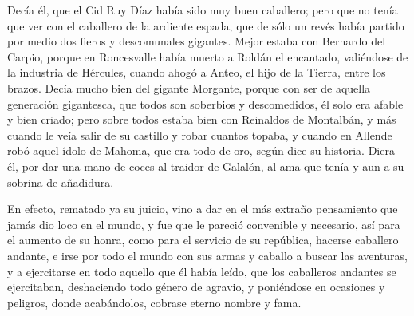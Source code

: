 \documentclass[12pt,
               twocolumn
              ]{article}
\begin{document}
Decía él, que el Cid Ruy Díaz había sido muy buen caballero; pero que
no tenía que ver con el caballero de la ardiente espada, que de sólo
un revés había partido por medio dos fieros y descomunales
gigantes. Mejor estaba con Bernardo del Carpio, porque en Roncesvalle
había muerto a Roldán el encantado, valiéndose de la industria de
Hércules, cuando ahogó a Anteo, el hijo de la Tierra, entre los
brazos. Decía mucho bien del gigante Morgante, porque con ser de
aquella generación gigantesca, que todos son soberbios y descomedidos,
él solo era afable y bien criado; pero sobre todos estaba bien con
Reinaldos de Montalbán, y más cuando le veía salir de su castillo y
robar cuantos topaba, y cuando en Allende robó aquel ídolo de Mahoma,
que era todo de oro, según dice su historia. Diera él, por dar una
mano de coces al traidor de Galalón, al ama que tenía y aun a su
sobrina de añadidura.

En efecto, rematado ya su juicio, vino a dar en el más extraño
pensamiento que jamás dio loco en el mundo, y fue que le pareció
convenible y necesario, así para el aumento de su honra, como para el
servicio de su república, hacerse caballero andante, e irse por todo
el mundo con sus armas y caballo a buscar las aventuras, y a
ejercitarse en todo aquello que él había leído, que los caballeros
andantes se ejercitaban, deshaciendo todo género de agravio, y
poniéndose en ocasiones y peligros, donde acabándolos, cobrase eterno
nombre y fama.
\end{document}
